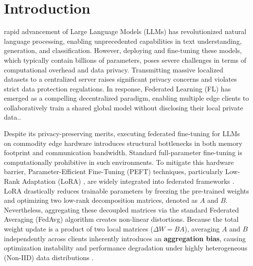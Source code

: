 \documentclass[journal]{IEEEtran}
\begin{document}
%
\IEEEpeerreviewmaketitle



\section{Introduction}
% 
% 
% 
% 
 rapid advancement of Large Language Models (LLMs) has revolutionized natural language processing, enabling unprecedented capabilities in text understanding, generation, and classification. However, deploying and fine-tuning these models, which typically contain billions of parameters, poses severe challenges in terms of computational overhead and data privacy. Transmitting massive localized datasets to a centralized server raises significant privacy concerns and violates strict data protection regulations. In response, Federated Learning (FL) has emerged as a compelling decentralized paradigm, enabling multiple edge clients to collaboratively train a shared global model without disclosing their local private data.\cite{mcmahan2017communication, kairouz2021advances}.

Despite its privacy-preserving merits, executing federated fine-tuning for LLMs on commodity edge hardware introduces structural bottlenecks in both memory footprint and communication bandwidth. Standard full-parameter fine-tuning is computationally prohibitive in such environments. To mitigate this hardware barrier, Parameter-Efficient Fine-Tuning (PEFT) techniques, particularly Low-Rank Adaptation (LoRA) \cite{hu2021lora}, are widely integrated into federated frameworks \cite{zhang2023fedpet}. LoRA drastically reduces trainable parameters by freezing the pre-trained weights and optimizing two low-rank decomposition matrices, denoted as $A$ and $B$. Nevertheless, aggregating these decoupled matrices via the standard Federated Averaging (FedAvg) algorithm creates non-linear distortions. Because the total weight update is a product of two local matrices ($\Delta W = BA$), averaging $A$ and $B$ independently across clients inherently introduces an \textbf{aggregation bias}, causing optimization instability and performance degradation under highly heterogeneous (Non-IID) data distributions \cite{zhao2018federated}.
\end{document}

